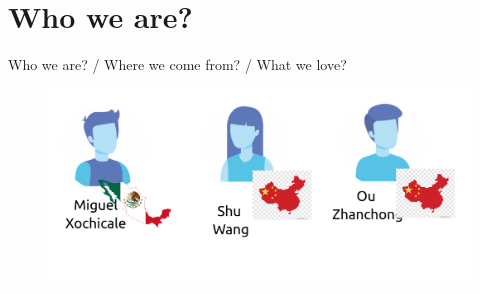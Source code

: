 \section{Who we are?}


{
\begin{frame}{Who we are? / Where we come from? / What we love?}

  \begin{figure}
  \centering
  \includegraphics[width=1.0\textwidth]{./figures/who-we-are/versions/drawing-v00.png}
  \end{figure}

\end{frame}
}

